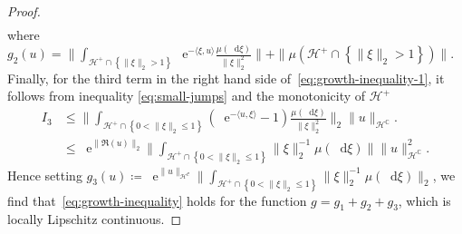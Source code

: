 \documentclass[10pt,a4paper]{amsart}
\newcommand*\D{\mathop{}\!\mathrm{d}}
\newcommand*\E{\mathop{}\!\mathrm{e}}
\newcommand{\cH}{\mathcal{H}}
\newcommand{\cHplus}{\cH^{+}}
\newcommand{\df}{\coloneqq}
\newcommand{\norm}[1]{\|#1\|}
\newcommand{\set}[1]{\left\{ #1\right\}}
\begin{document}
\begin{proof}
\begin{align*}
  \end{align*}
  where $g_{2}(u)=\norm{\int_{\cHplus\cap\set{\norm{\xi}_2>1}}\E^{-\langle
    \xi, u\rangle}\frac{\mu(\D\xi)}{\norm{\xi}_2^{2}}}+\norm{\mu(\cHplus\cap\set{\norm{\xi}_2>1})}$.
  Finally, for the third term in the right hand side of~\eqref{eq:growth-inequality-1}, it follows from inequality \eqref{eq:small-jumps} and the monotonicity of $\cHplus$
   \begin{align*}
  I_3 &\leq
   \norm{\int_{\cHplus\cap\set{0<\norm{\xi}_2\leq 1}}(\E^{-\langle u,\xi\rangle}-1)\frac{\mu(\D\xi)}{\norm{\xi}_2^{2}}}_{2}\norm{u}_{\cH^{\mathbb{C}}}.\\  
   &\leq\E^{\norm{\Re(u)}_2}\norm{\int_{\cHplus\cap\set{0<\norm{\xi}_2\leq
    1}}\norm{\xi}_2^{-1}\mu(\D\xi)}\norm{u}_{\cH^{\mathbb{C}}}^2.
  \end{align*}
  Hence setting
  $g_{3}(u)\df\E^{\norm{u}_{\cH^{\mathcal{C}}}}\norm{\int_{\cHplus\cap\set{0<\norm{\xi}_2\leq
        1}}\norm{\xi}_2^{-1}\mu(\D\xi)}_2$, we find that~\eqref{eq:growth-inequality} holds for the
  function $g=g_{1}+g_{2}+g_{3}$, which is locally Lipschitz continuous. 
\end{proof}
\end{document}
